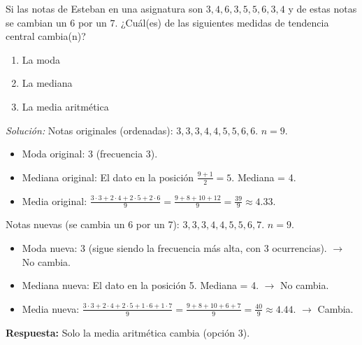 \documentclass[12pt, letterpaper]{article}
\begin{document}
\noindent %
Si las notas de Esteban en una asignatura son \(3, 4, 6, 3, 5, 5, 6, 3, 4\) y de estas notas se cambian un $6$ por un $7$. ¿Cuál(es) de las siguientes medidas de tendencia central cambia(n)?
\begin{enumerate}
    \item La moda
    \item La mediana
    \item La media aritmética
\end{enumerate}
\textit{Solución:}
Notas originales (ordenadas): \(3, 3, 3, 4, 4, 5, 5, 6, 6\). $n=9$.
\begin{itemize}
    \item Moda original: 3 (frecuencia 3).
    \item Mediana original: El dato en la posición $\frac{9+1}{2}=5$. Mediana = 4.
    \item Media original: $\frac{3 \cdot 3 + 2 \cdot 4 + 2 \cdot 5 + 2 \cdot 6}{9} = \frac{9+8+10+12}{9} = \frac{39}{9} \approx 4.33$.
\end{itemize}
Notas nuevas (se cambia un 6 por un 7): \(3, 3, 3, 4, 4, 5, 5, 6, 7\). $n=9$.
\begin{itemize}
    \item Moda nueva: 3 (sigue siendo la frecuencia más alta, con 3 ocurrencias). $\rightarrow$ No cambia.
    \item Mediana nueva: El dato en la posición 5. Mediana = 4. $\rightarrow$ No cambia.
    \item Media nueva: $\frac{3 \cdot 3 + 2 \cdot 4 + 2 \cdot 5 + 1 \cdot 6 + 1 \cdot 7}{9} = \frac{9+8+10+6+7}{9} = \frac{40}{9} \approx 4.44$. $\rightarrow$ Cambia.
\end{itemize}
\textbf{Respuesta:} Solo la media aritmética cambia (opción 3).
\end{document}
